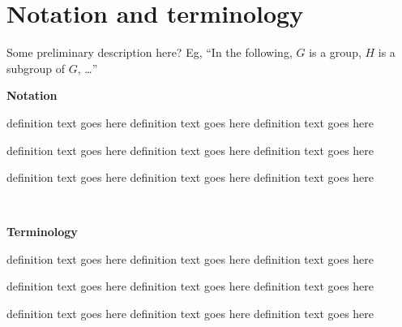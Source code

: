 

\chapter{Notation and terminology}\label{notation}

\renewcommand{\thefootnote}{\fnsymbol{footnote}}



Some preliminary description here?  Eg, ``In the following, $G$ is
a group, $H$ is a subgroup of $G$, \ldots''
\vspace{2em}


\noindent\textbf{Notation}


\newcommand{\nttn}[2]{\item[{\ \makebox[3.18cm][l]{#1}}]{#2}}
\begin{list}{}{ \setlength{\leftmargin}{3.4cm}
                \setlength{\labelwidth}{3.4cm}}

\nttn{notation}{definition text goes here definition text goes
                here definition text goes here}

\nttn{notation}{definition text goes here definition text goes
                here definition text goes here}

\nttn{notation}{definition text goes here definition text goes
                here definition text goes here}

\end{list}

\

\noindent\textbf{Terminology}


\newcommand{\term}[2]{\item[{\ \makebox[4.58cm][l]{#1}}]{#2}}
\begin{list}{}{ \setlength{\leftmargin}{4.8cm}
                \setlength{\labelwidth}{4.8cm}}

\term{terminology}{definition text goes here definition text goes
                   here definition text goes here}

\term{terminology}{definition text goes here definition text goes
                   here definition text goes here}

\term{terminology}{definition text goes here definition text goes
                   here definition text goes here}

\end{list}
